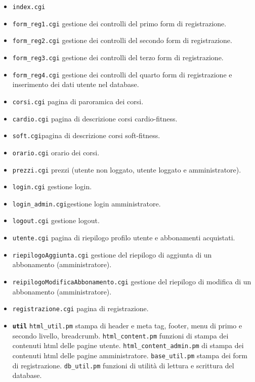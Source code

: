 \documentclass[12pt,a4paper]{article}
\begin{document}
\begin{itemize}
	\item \texttt{index.cgi}
	\item \texttt{form\_reg1.cgi} gestione dei controlli del primo form di registrazione. 
	\item \texttt{form\_reg2.cgi} gestione dei controlli del secondo form di registrazione.
	\item \texttt{form\_reg3.cgi} gestione dei controlli del terzo form di registrazione.
	\item \texttt{form\_reg4.cgi} gestione dei controlli del quarto form di registrazione e inserimento dei dati utente nel database.
	\item \texttt{corsi.cgi} pagina di paroramica dei corsi.
	\item \texttt{cardio.cgi} pagina di descrizione corsi cardio-fitness.
	\item \texttt{soft.cgi}pagina di descrizione corsi soft-fitness.
	\item \texttt{orario.cgi} orario dei corsi. 
	\item \texttt{prezzi.cgi} prezzi (utente non loggato, utente loggato e amministratore).
	\item \texttt{login.cgi} gestione login. 
	\item \texttt{login\_admin.cgi}gestione login amministratore.
	\item \texttt{logout.cgi} gestione logout.
	\item \texttt{utente.cgi}	pagina di riepilogo profilo utente e abbonamenti acquistati. 
	\item \texttt{riepilogoAggiunta.cgi} gestione del riepilogo di aggiunta di un abbonamento (amministratore).
	\item \texttt{reipilogoModificaAbbonamento.cgi} gestione del riepilogo di modifica di un abbonamento (amministratore).
	\item \texttt{registrazione.cgi}  pagina di registrazione.
	\item\textbf{ \texttt{util}}
	\subitem \texttt{html\_util.pm} stampa di header e meta tag, footer, menu di primo e secondo livello, breadcrumb. 
	\subitem \texttt{html\_content.pm} funzioni di stampa dei contenuti html delle pagine utente.
	\subitem \texttt{html\_content\_admin.pm}  di stampa dei contenuti html delle pagine amministratore. 
	\subitem \texttt{base\_util.pm} stampa dei form di registrazione. 
	\subitem \texttt{db\_util.pm} funzioni di utilità di lettura e scrittura del database. 
\end{itemize}
\end{document}

